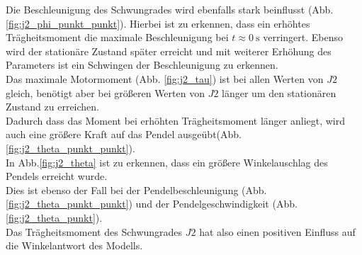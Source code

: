 Die Beschleunigung des Schwungrades wird ebenfalls stark beinflusst (Abb. \ref{fig:j2_phi_punkt_punkt}).
Hierbei ist zu erkennen, dass ein erhöhtes Trägheitsmoment die maximale Beschleunigung bei $t\approx\SI{0}{\s}$ verringert. 
Ebenso wird der stationäre Zustand später erreicht und mit weiterer Erhöhung des Parameters ist ein Schwingen der Beschleunigung zu erkennen.\\
   
Das maximale Motormoment (Abb. \ref{fig:j2_tau}) ist bei allen Werten von $J2$ gleich, benötigt aber bei größeren Werten von $J2$ länger um den stationären Zustand zu erreichen.\\
Dadurch dass das Moment bei erhöhten Trägheitsmoment länger anliegt, wird auch eine größere Kraft auf das Pendel ausgeübt(Abb. \ref{fig:j2_theta_punkt_punkt}).\\
In Abb.\ref{fig:j2_theta} ist zu erkennen, dass ein größere Winkelauschlag des Pendels erreicht wurde.\\
Dies ist ebenso der Fall bei der Pendelbeschleunigung (Abb. \ref{fig:j2_theta_punkt_punkt}) und der Pendelgeschwindigkeit (Abb. \ref{fig:j2_theta_punkt}).\\

 Das Trägheitsmoment des Schwungrades $J2$ hat also einen positiven Einfluss auf die Winkelantwort des Modells.\\  
 

